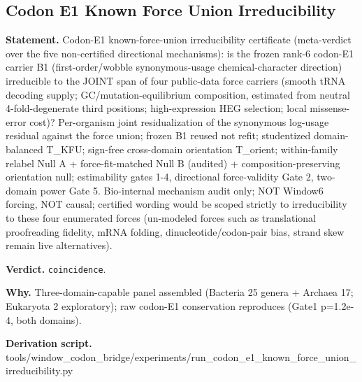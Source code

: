 \subsection{Codon E1 Known Force Union Irreducibility}\label{sec:bridge-codon-e1-known-force-union-irreducibility}
\textbf{Statement.} Codon-E1 known-force-union irreducibility certificate (meta-verdict over the five non-certified
directional mechanisms): is the frozen rank-6 codon-E1 carrier B1 (first-order/wobble
synonymous-usage chemical-character direction) irreducible to the JOINT span of four public-data
force carriers (smooth tRNA decoding supply; GC/mutation-equilibrium composition, estimated from
neutral 4-fold-degenerate third positions; high-expression HEG selection; local missense-error
cost)? Per-organism joint residualization of the synonymous log-usage residual against the force
union; frozen B1 reused not refit; studentized domain-balanced T\_KFU; sign-free cross-domain
orientation T\_orient; within-family relabel Null A + force-fit-matched Null B (audited) +
composition-preserving orientation null; estimability gates 1-4, directional force-validity Gate 2,
two-domain power Gate 5. Bio-internal mechanism audit only; NOT Window6 forcing, NOT causal;
certified wording would be scoped strictly to irreducibility to these four enumerated forces
(un-modeled forces such as translational proofreading fidelity, mRNA folding,
dinucleotide/codon-pair bias, strand skew remain live alternatives).

\textbf{Verdict.} \texttt{coincidence}.

\textbf{Why.} Three-domain-capable panel assembled (Bacteria 25 genera + Archaea 17; Eukaryota 2 exploratory); raw
codon-E1 conservation reproduces (Gate1 p=1.2e-4, both domains).

\textbf{Derivation script.} tools/window\_codon\_bridge/experiments/run\_codon\_e1\_known\_force\_union\_irreducibility.py

